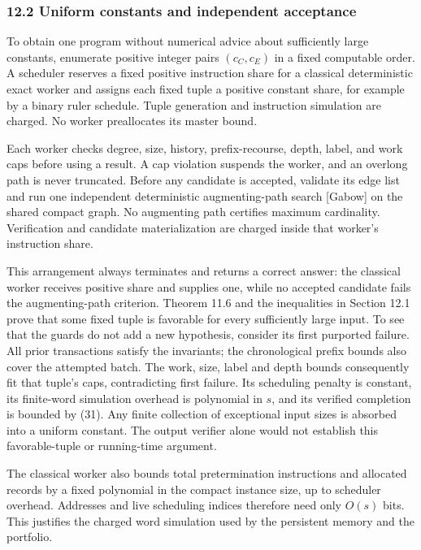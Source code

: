 \hypertarget{af-46593eb93e-uniform-constants-and-independent-acceptance}{%
\subsubsection{12.2 Uniform constants and independent acceptance}\label{af-46593eb93e-uniform-constants-and-independent-acceptance}}

To obtain one program without numerical advice about sufficiently large constants, enumerate positive integer pairs \((c_C,c_E)\) in a fixed computable order. A scheduler reserves a fixed positive instruction share for a classical deterministic exact worker and assigns each fixed tuple a positive constant share, for example by a binary ruler schedule. Tuple generation and instruction simulation are charged. No worker preallocates its master bound.

Each worker checks degree, size, history, prefix-recourse, depth, label, and work caps before using a result. A cap violation suspends the worker, and an overlong path is never truncated. Before any candidate is accepted, validate its edge list and run one independent deterministic augmenting-path search {[}Gabow{]} on the shared compact graph. No augmenting path certifies maximum cardinality. Verification and candidate materialization are charged inside that worker's instruction share.

This arrangement always terminates and returns a correct answer: the classical worker receives positive share and supplies one, while no accepted candidate fails the augmenting-path criterion. Theorem 11.6 and the inequalities in Section 12.1 prove that some fixed tuple is favorable for every sufficiently large input. To see that the guards do not add a new hypothesis, consider its first purported failure. All prior transactions satisfy the invariants; the chronological prefix bounds also cover the attempted batch. The work, size, label and depth bounds consequently fit that tuple's caps, contradicting first failure. Its scheduling penalty is constant, its finite-word simulation overhead is polynomial in \(s\), and its verified completion is bounded by (31). Any finite collection of exceptional input sizes is absorbed into a uniform constant. The output verifier alone would not establish this favorable-tuple or running-time argument.

The classical worker also bounds total pretermination instructions and allocated records by a fixed polynomial in the compact instance size, up to scheduler overhead. Addresses and live scheduling indices therefore need only \(O(s)\) bits. This justifies the charged word simulation used by the persistent memory and the portfolio.

